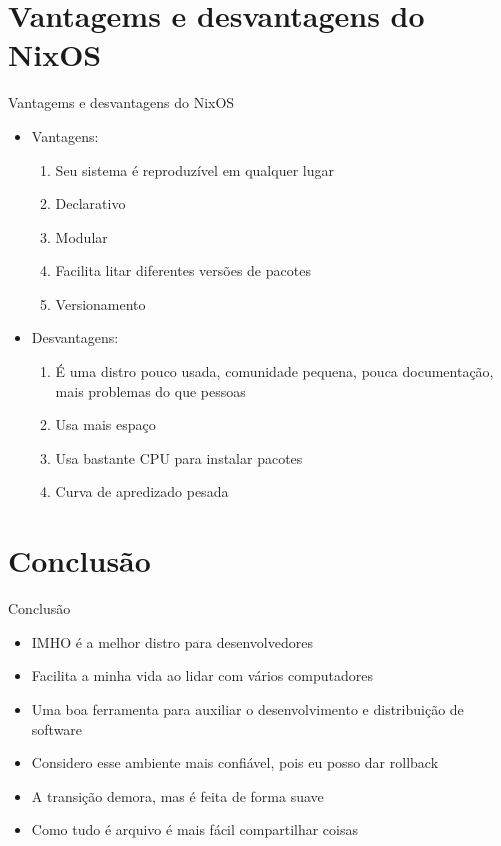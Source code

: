 \documentclass[presentation]{beamer}
\begin{document}
\section{Vantagems e desvantagens do NixOS}
\label{sec:org22b4149}
\begin{frame}[label={sec:org4177396}]{Vantagems e desvantagens do NixOS}
\begin{itemize}
\item Vantagens:
\begin{enumerate}
\item Seu sistema é reproduzível em qualquer lugar
\item Declarativo
\item Modular
\item Facilita litar diferentes versões de pacotes
\item Versionamento
\end{enumerate}
\item Desvantagens:
\begin{enumerate}
\item É uma distro pouco usada, comunidade pequena, pouca documentação, mais problemas do que pessoas
\item Usa mais espaço
\item Usa bastante CPU para instalar pacotes
\item Curva de apredizado pesada
\end{enumerate}
\end{itemize}
\end{frame}

\section{Conclusão}
\label{sec:org172365a}
\begin{frame}[label={sec:orge530d64}]{Conclusão}
\begin{itemize}
\item IMHO é a melhor distro para desenvolvedores
\item Facilita a minha vida ao lidar com vários computadores
\item Uma boa ferramenta para auxiliar o desenvolvimento e distribuição de software
\item Considero esse ambiente mais confiável, pois eu posso dar rollback
\item A transição demora, mas é feita de forma suave
\item Como tudo é arquivo é mais fácil compartilhar coisas
\end{itemize}
\end{frame}
\end{document}
